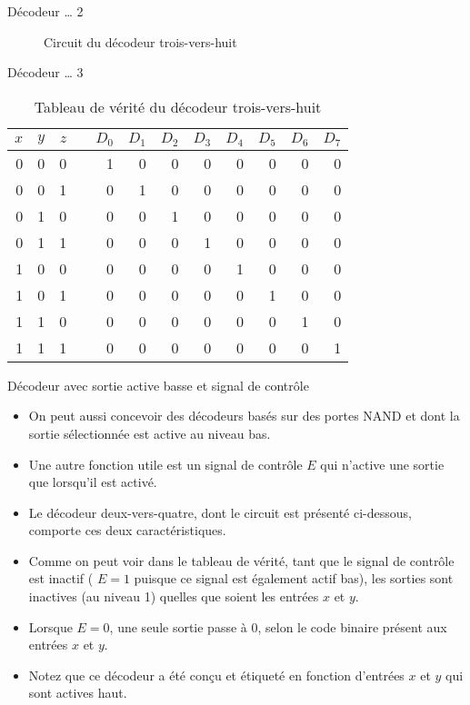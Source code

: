 \documentclass[presentation]{beamer}
\begin{document}
\begin{frame}[label={sec:orgde467f0}]{Décodeur \ldots{} 2}
\begin{figure}[htbp]
\centering

\caption{\label{fig:orgd8f77ab}Circuit du décodeur trois-vers-huit}
\end{figure}
\end{frame}

\begin{frame}[label={sec:orgcd10f09}]{Décodeur \ldots{} 3}
\begin{table}[htbp]
\caption{\label{tab:org3e3bd15}Tableau de vérité du décodeur trois-vers-huit}
\centering
\begin{tabular}{rrrlrrrrrrrr}
\(x\) & \(y\) & \(z\) &  & \(D_0\) & \(D_1\) & \(D_2\) & \(D_3\) & \(D_4\) & \(D_5\) & \(D_6\) & \(D_7\)\\
\hline
0 & 0 & 0 &  & 1 & 0 & 0 & 0 & 0 & 0 & 0 & 0\\
0 & 0 & 1 &  & 0 & 1 & 0 & 0 & 0 & 0 & 0 & 0\\
0 & 1 & 0 &  & 0 & 0 & 1 & 0 & 0 & 0 & 0 & 0\\
0 & 1 & 1 &  & 0 & 0 & 0 & 1 & 0 & 0 & 0 & 0\\
1 & 0 & 0 &  & 0 & 0 & 0 & 0 & 1 & 0 & 0 & 0\\
1 & 0 & 1 &  & 0 & 0 & 0 & 0 & 0 & 1 & 0 & 0\\
1 & 1 & 0 &  & 0 & 0 & 0 & 0 & 0 & 0 & 1 & 0\\
1 & 1 & 1 &  & 0 & 0 & 0 & 0 & 0 & 0 & 0 & 1\\
\end{tabular}
\end{table}
\end{frame}

\begin{frame}[label={sec:org93e0f79}]{Décodeur avec sortie active basse et signal de contrôle}
\begin{itemize}
\item On peut aussi concevoir des décodeurs basés sur des portes NAND et dont la sortie sélectionnée est active au niveau bas.

\item Une autre fonction utile est un signal de contrôle \(E\) qui n'active une sortie que lorsqu'il est activé.

\item Le décodeur deux-vers-quatre, dont le circuit est présenté ci-dessous, comporte ces deux caractéristiques.

\item Comme on peut voir dans le tableau de vérité, tant que le signal de contrôle est inactif ( \(E = 1\) puisque ce signal est également actif bas), les sorties sont inactives (au niveau 1) quelles que soient les entrées \(x\) et \(y\).

\item Lorsque \(E = 0\), une seule sortie passe à 0, selon le code binaire présent aux entrées \(x\) et \(y\).

\item Notez que ce décodeur a été conçu et étiqueté en fonction d'entrées \(x\) et \(y\) qui sont actives haut.
\end{itemize}
\end{frame}
\end{document}

